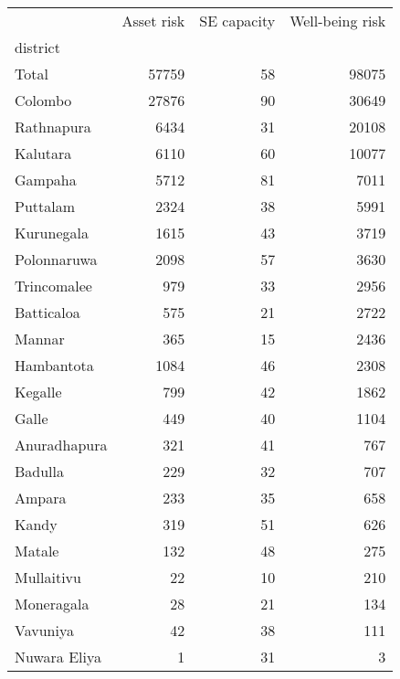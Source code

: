 \begin{tabular}{lrrr}
\toprule
{} &  Asset risk &  SE capacity &  Well-being risk \\
district     &             &              &                  \\
\midrule
Total        &       57759 &           58 &            98075 \\
Colombo      &       27876 &           90 &            30649 \\
Rathnapura   &        6434 &           31 &            20108 \\
Kalutara     &        6110 &           60 &            10077 \\
Gampaha      &        5712 &           81 &             7011 \\
Puttalam     &        2324 &           38 &             5991 \\
Kurunegala   &        1615 &           43 &             3719 \\
Polonnaruwa  &        2098 &           57 &             3630 \\
Trincomalee  &         979 &           33 &             2956 \\
Batticaloa   &         575 &           21 &             2722 \\
Mannar       &         365 &           15 &             2436 \\
Hambantota   &        1084 &           46 &             2308 \\
Kegalle      &         799 &           42 &             1862 \\
Galle        &         449 &           40 &             1104 \\
Anuradhapura &         321 &           41 &              767 \\
Badulla      &         229 &           32 &              707 \\
Ampara       &         233 &           35 &              658 \\
Kandy        &         319 &           51 &              626 \\
Matale       &         132 &           48 &              275 \\
Mullaitivu   &          22 &           10 &              210 \\
Moneragala   &          28 &           21 &              134 \\
Vavuniya     &          42 &           38 &              111 \\
Nuwara Eliya &           1 &           31 &                3 \\
\bottomrule
\end{tabular}

